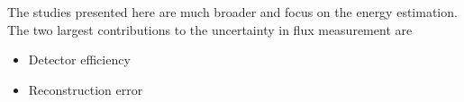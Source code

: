 \documentclass{article}
\begin{document}
The studies presented here are much broader and focus on the energy estimation.  The two largest contributions to the uncertainty in flux measurement are

\begin{itemize}
\item Detector efficiency
\item Reconstruction error
\end{itemize}








\end{document}
